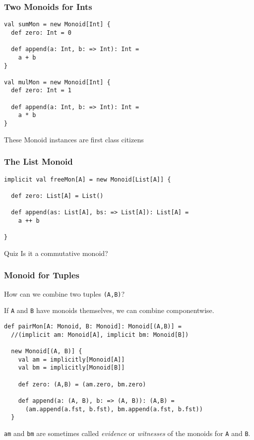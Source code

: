 \documentclass{beamer}
\begin{document}
\begin{frame}[fragile]\frametitle{Two Monoids for Ints}
  \begin{block}{}
  \begin{lstlisting}
val sumMon = new Monoid[Int] {
  def zero: Int = 0

  def append(a: Int, b: => Int): Int =
    a + b
}

val mulMon = new Monoid[Int] {
  def zero: Int = 1

  def append(a: Int, b: => Int): Int =
    a * b
}
  \end{lstlisting}
  \end{block}
  These Monoid \alert{instances} are first class citizens
\end{frame}

\begin{frame}[fragile]\frametitle{The List Monoid}
  \begin{block}{}

  \begin{lstlisting}
implicit val freeMon[A] = new Monoid[List[A]] {

  def zero: List[A] = List()

  def append(as: List[A], bs: => List[A]): List[A] =
    a ++ b

}
  \end{lstlisting}
  \end{block}

  \begin{block}{Quiz}
Is it a commutative monoid?
  \end{block}
\end{frame}

\begin{frame}[fragile]\frametitle{Monoid for Tuples}
  How can we combine two tuples \texttt{(A,B)}?
  \pause

  If \texttt{A} and \texttt{B} have monoids themselves, we can \alert{combine componentwise}.

  \begin{block}{}
  \begin{lstlisting}
def pairMon[A: Monoid, B: Monoid]: Monoid[(A,B)] =
  //(implicit am: Monoid[A], implicit bm: Monoid[B])

  new Monoid[(A, B)] {
    val am = implicitly[Monoid[A]]
    val bm = implicitly[Monoid[B]]

    def zero: (A,B) = (am.zero, bm.zero)

    def append(a: (A, B), b: => (A, B)): (A,B) =
      (am.append(a.fst, b.fst), bm.append(a.fst, b.fst))
  }
  \end{lstlisting}
  \end{block}

  \texttt{am} and \texttt{bm} are sometimes called \emph{evidence} or
  \emph{witnesses} of the monoids for \texttt{A} and \texttt{B}.
\end{frame}
\end{document}
